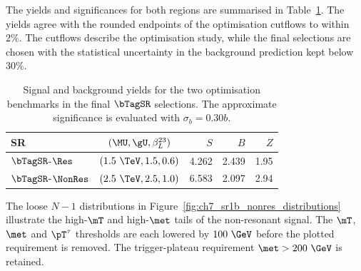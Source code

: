 The yields and significances for both regions are summarised in Table~\ref{tab:ch7_prefit_yields}.
The yields agree with the rounded endpoints of the optimisation cutflows to within $2\%$.
The cutflows describe the optimisation study, while the final selections are chosen with the statistical uncertainty in the background prediction kept below $30\%$.

\begin{table}[htbp]
    \centering
    \small
    \caption{Signal and background yields for the two optimisation benchmarks in the final $\bTagSR$ selections. The approximate significance is evaluated with $\sigma_b=0.30b$.}
    \label{tab:ch7_prefit_yields}
    \begin{tabular}{lcrrr}
        \toprule
        SR & $(\MU,\gU,\beta_L^{23})$ & $S$ & $B$ & $Z$ \\
        \midrule
        $\bTagSR$-$\Res$ & $(1.5~\TeV,1.5,0.6)$ & 4.262 & 2.439 & 1.95 \\
        $\bTagSR$-$\NonRes$ & $(2.5~\TeV,2.5,1.0)$ & 6.583 & 2.097 & 2.94 \\
        \bottomrule
    \end{tabular}
\end{table}

The loose $N-1$ distributions in Figure~\ref{fig:ch7_sr1b_nonres_distributions} illustrate the high-$\mT$ and high-$\met$ tails of the non-resonant signal.
The $\mT$, $\met$ and $\pT^\tau$ thresholds are each lowered by $100~\GeV$ before the plotted requirement is removed.
The trigger-plateau requirement $\met>200~\GeV$ is retained.


